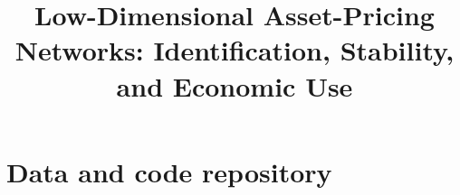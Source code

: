 \documentclass[final,3p,times,authoryear]{elsarticle}
\begin{document}
\begin{frontmatter}
\title{Low-Dimensional Asset-Pricing Networks: Identification, Stability, and Economic Use}

\end{frontmatter}

\section*{Data and code repository}

\end{document}
